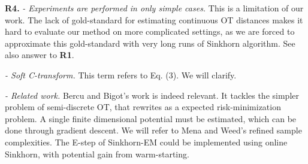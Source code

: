 \documentclass{article}
\begin{document}
\textbf{R4.} \textit{- Experiments are performed in only simple cases.} This is a limitation of our work. The lack of gold-standard for estimating continuous OT distances makes it hard to evaluate our method on more complicated settings, as we are forced to approximate this gold-standard with very long runs of Sinkhorn algorithm. See also answer to \textbf{R1}.

\textit{- Soft C-transform.} This term refers to Eq. (3). We will clarify.

\textit{- Related work.} Bercu and Bigot's work is indeed relevant. It tackles the simpler problem of semi-discrete OT, that rewrites as a expected risk-minimization problem. A single finite dimensional potential must be estimated, which can be done through gradient descent. We will refer to Mena and Weed's refined sample complexities. The E-step of Sinkhorn-EM could be implemented using online Sinkhorn, with potential gain from warm-starting.
\end{document}
